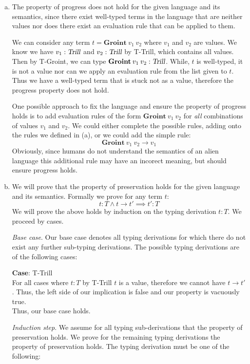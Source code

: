 \documentclass[12pt, fleqn]{article}
\begin{document}
\begin{enumerate}[(a)]
    \item The property of progress does not hold for the given language and its semantics, since there exist well-typed terms in the language that are neither values nor does there exist an evaluation rule that can be applied to them.
    
    We can consider any term $t = \textbf{Groint}\:v_1\:v_2$ where $v_1$ and $v_2$ are values. We know we have $v_1 : \textsl{Trill}$ and $v_2 : \textsl{Trill}$ by T-Trill, which contains all values. Then by T-Groint, we can type $\textbf{Groint}\:v_1\:v_2 : \textsl{Trill}$. While, $t$ is well-typed, it is not a value nor can we apply an evaluation rule from the list given to $t$. Thus we have a well-typed term that is stuck not as a value, therefore the progress property does not hold.

    One possible approach to fix the language and ensure the property of progress holds is to add evaluation rules of the form $\textbf{Groint}\:v_1\:v_2$ for \emph{all} combinations of values $v_1$ and $v_2$. We could either complete the possible rules, adding onto the rules we defined in (a), or we could add the simple rule:
    \begin{equation}
        \textbf{Groint}\:v_1\:v_2 \rightarrow v_1 \tag{E-GrointV}
    \end{equation}
    Obviously, since humans do not understand the semantics of an alien language this additional rule may have an incorect meaning, but should ensure progress holds.

    \item We will prove that the property of preservation holds for the given language and its semantics. Formally we prove for any term $t$:
    $$t : T \land t \rightarrow t' \implies t' : T$$
    We will prove the above holds by induction on the typing derivation $t : T$. We proceed by cases.
    
    \emph{Base case}. Our base case denotes all typing derivations for which there do not exist any further sub-typing derivations. The possible typing derivations are of the following cases:
    
    \textbf{Case}: T-Trill\\
    For all cases where $t:T$ by T-Trill $t$ is a value, therefore we cannot have $t \rightarrow t'$. Thus, the left side of our implication is false and our property is vacuously true.\\
    Thus, our base case holds.

    \emph{Induction step}. We assume for all typing sub-derivations that the property of preservation holds. We prove for the remaining typing derivations the property of preservation holds. The typing derivation must be one of the following:


\end{enumerate}
\end{document}
